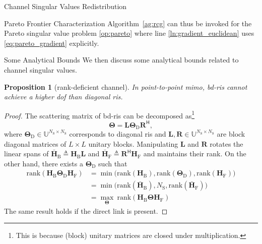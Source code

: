 \documentclass[journal]{IEEEtran}
\newtheorem{proposition}{Proposition}
\begin{document}
\begin{section}{Channel Singular Values Redistribution}
\begin{subsection}{Pareto Frontier Characterization}
		Algorithm~\ref{ag:rcg} can thus be invoked for the Pareto singular value problem \eqref{op:pareto} where line \ref{ln:gradient_euclidean} uses \eqref{eq:pareto_gradient} explicitly.
	\end{subsection}

	\begin{subsection}{Some Analytical Bounds}\label{ss:bounds}
		We then discuss some analytical bounds related to channel singular values.
		\begin{proposition}[rank-deficient channel]\label{pp:dof}
			In point-to-point \gls{mimo}, \gls{bd}-\gls{ris} cannot achieve a higher \gls{dof} than diagonal \gls{ris}.
		\end{proposition}
		\begin{proof}
			The scattering matrix of \gls{bd}-\gls{ris} can be decomposed as\footnote{This is because (block) unitary matrices are closed under multiplication.}
			\begin{equation}
				\mathbf{\Theta} = \mathbf{L} \mathbf{\Theta}_\mathrm{D} \mathbf{R}^\mathsf{H},
			\end{equation}
			where $\mathbf{\Theta}_\mathrm{D} \in \mathbb{U}^{N_\mathrm{S} \times N_\mathrm{S}}$ corresponds to diagonal \gls{ris} and $\mathbf{L}, \mathbf{R} \in \mathbb{U}^{N_\mathrm{S} \times N_\mathrm{S}}$ are block diagonal matrices of $L \times L$ unitary blocks.
			Manipulating $\mathbf{L}$ and $\mathbf{R}$ rotates the linear spans of $\bar{\mathbf{H}}_\mathrm{B} \triangleq \mathbf{H}_\mathrm{B} \mathbf{L}$ and $\bar{\mathbf{H}}_\mathrm{F} \triangleq \mathbf{R}^\mathsf{H} \mathbf{H}_\mathrm{F}$ and maintains their rank.
			On the other hand, there exists a $\mathbf{\Theta}_\mathrm{D}$ such that
			\begin{equation*}
				\begin{split}
					\mathrm{rank}(\mathbf{H}_\mathrm{B} \mathbf{\Theta}_\mathrm{D} \mathbf{H}_\mathrm{F})
					& = \min \bigl( \mathrm{rank}(\mathbf{H}_\mathrm{B}), \mathrm{rank}(\mathbf{\Theta}_\mathrm{D}), \mathrm{rank}(\mathbf{H}_\mathrm{F}) \bigr) \\
					& = \min \bigl( \mathrm{rank}(\bar{\mathbf{H}}_\mathrm{B}), N_\mathrm{S}, \mathrm{rank}(\bar{\mathbf{H}}_\mathrm{F}) \bigr) \\
					& = \max_\mathbf{\Theta} \ \mathrm{rank}(\mathbf{H}_\mathrm{B} \mathbf{\Theta} \mathbf{H}_\mathrm{F})
				\end{split}
			\end{equation*}
			The same result holds if the direct link is present.
		\end{proof}


\end{subsection}
\end{section}
\end{document}

